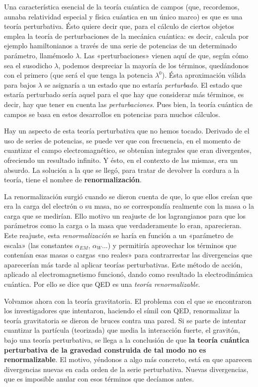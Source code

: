 \documentclass[11pt,a4paper,titlepage]{article}
\begin{document}
Una característica esencial de la teoría cuántica de campos (que, recordemos, aunaba relatividad especial y física cuántica en un único marco) es que es una teoría perturbativa. Ésto quiere decir que, para el cálculo de ciertos objetos emplea la teoría de perturbaciones de la mecánica cuántica: es decir, calcula por ejemplo hamiltonianos a través de una serie de potencias de un determinado parámetro, llamémoslo $\lambda$. Las «perturbaciones» vienen aquí de que, según cómo sea el susodicho $\lambda$, podemos despreciar la mayoría de los términos, quedándonos con el primero (que será el que tenga la potencia $\lambda^0$). Ésta aproximación válida para bajos $\lambda$ se asignaría a un estado que no estaría \textit{perturbado}. El estado que estaría perturbado sería aquel para el que hay que considerar más términos, es decir, hay que tener en cuenta las \textit{perturbaciones}. Pues bien, la teoría cuántica de campos se basa en estos desarrollos en potencias para muchos cálculos.

Hay un aspecto de esta teoría perturbativa que no hemos tocado. Derivado de el uso de series de potencias, se puede ver que con frecuencia, en el momento de cuantizar el campo electromagnético, se obtenían integrales que eran divergentes, ofreciendo un resultado infinito. Y ésto, en el contexto de las mismas, era un absurdo. La solución a la que se llegó, para tratar de devolver la cordura a la teoría, tiene el nombre de \textbf{renormalización}.

La renormalización surgió cuando se dieron cuenta de que, lo que ellos creían que era la carga del electrón o su masa, no se correspondía realmente con la masa o la carga que se medirían. Ello motivo un reajuste de los lagrangianos para que los parámetros como la carga o la masa que verdaderamente lo eran, aparecieran. Este reajuste, esta \textit{renormalización} se haría en función a un «parámetro de escala» (las constantes $\alpha_{EM}$, $\alpha_W$...) y permitiría aprovechar los términos que contenían esas masas o cargas «no reales» para contrarrestar las divergencias que aparecerían más tarde al aplicar teorías perturbativas. Este método de acción, aplicado al electromagnetismo funcionó, dando como resultado la electrodinámica cuántica. Por ello se dice que QED es una \textit{teoría renormalizable}.

Volvamos ahora con la teoría gravitatoria. El problema con el que se encontraron los investigadores que intentaron, haciendo el símil con QED, renormalizar la teoría gravitatoria se dieron de bruces contra una pared. Si se parte de intentar cuantizar la partícula (teorizada) que media la interacción fuerte, el gravitón, bajo una teoría perturbativa, se llega a la conclusión de que \textbf{la teoría cuántica perturbativa de la gravedad construida de tal modo no es renormalizable}. El motivo, yéndonos a algo más concreto, está en que aparecen divergencias nuevas en cada orden de la serie perturbativa. Nuevas divergencias, que es imposible anular con esos términos que decíamos antes.
\end{document}
